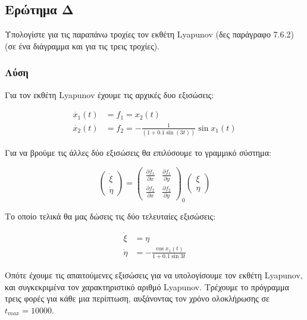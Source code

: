 \documentclass{article}
\begin{document}
\subsection{Ερώτημα Δ}

\indent Υπολογίστε για τις παραπάνω τροχίες τον εκθέτη \textlatin{Lyapunov} (δες παράγραφο 7.6.2) (σε ένα διάγραμμα και για τις τρεις τροχίες).

\subsubsection{Λύση}

\indent Για τον εκθέτη Lyapunov έχουμε τις αρχικές δυο εξισώσεις:

\begin{align}
    \dot{x_1}(t)&=f_1=x_2(t)\\
    \dot{x_2}(t)&=f_2=-\frac{1}{(1+0.1 \sin (3 t))} \sin x_1(t)
\end{align}

Για να βρούμε τις άλλες δύο εξισώσεις θα επιλύσουμε το γραμμικό σύστημα:

\begin{equation}
\left(\begin{array}{l}
\dot{\xi} \\
\dot{\eta}
\end{array}\right)=\left(\begin{array}{ll}
\frac{\partial f_{1}}{\partial x} & \frac{\partial f_{1}}{\partial y} \\
\frac{\partial f_{2}}{\partial x} & \frac{\partial f_{2}}{\partial y}
\end{array}\right)_{0}\left(\begin{array}{l}
\xi \\
\eta
\end{array}\right)
\end{equation}

Το οποίο τελικά θα μας δώσεις τις δύο τελευταίες εξισώσεις:

\begin{align}
    \dot{\xi}&=\eta\\
    \dot{\eta}&=-\frac{\cos{x_1(t)}}{1+0.1\sin{3t}}
\end{align}

Οπότε έχουμε τις απαιτούμενες εξισώσεις για να υπολογίσουμε τον εκθέτη \textlatin{Lyapunov}, και συγκεκριμένα τον χαρακτηριστικό αριθμό \textlatin{Lyapunov}. Τρέχουμε το πρόγραμμα τρεις φορές για κάθε μια περίπτωση, αυξάνοντας τον χρόνο ολοκλήρωσης σε \(t_{max}=10000\). 
\end{document}
